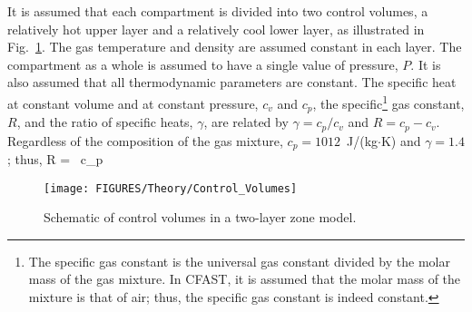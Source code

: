\documentclass[12pt]{book}
\begin{document}
It is assumed that each compartment is divided into two control volumes, a relatively hot upper layer and a relatively cool lower layer, as illustrated in Fig.~\ref{fig:Control_Volumes}. The gas temperature and density are assumed constant in each layer. The compartment as a whole is assumed to have a single value of pressure, $P$. It is also assumed that all thermodynamic parameters are constant. The specific heat at constant volume and at constant pressure, $c_v$ and $c_p$, the specific\footnote{The specific gas constant is the universal gas constant divided by the molar mass of the gas mixture. In CFAST, it is assumed that the molar mass of the mixture is that of air; thus, the specific gas constant is indeed constant.} gas constant, $R$, and the ratio of specific heats, $\gamma$, are related by $\gamma = c_p / c_v$ and $R = c_p- c_v$. Regardless of the composition of the gas mixture, $c_p = 1012$~J/(kg$\cdot$K) and $\gamma = 1.4$; thus,
\be
   R =  \, c_p  \; 
\ee
\begin{figure}[h]
\begin{center}
\texttt{[image: FIGURES/Theory/Control\_Volumes]}\\
\end{center}
\caption{Schematic of control volumes in a two-layer zone model.}
 \label{fig:Control_Volumes}
\end{figure}
\end{document}
